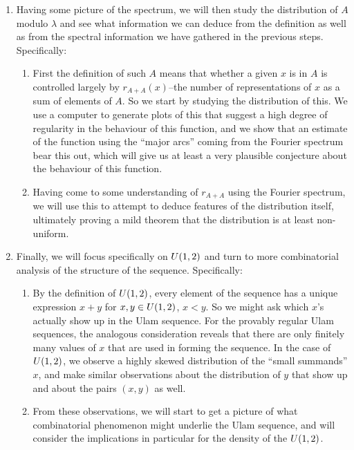 \documentclass{article}
\theoremstyle{definition}
\theoremstyle{remark}
\numberwithin{equation}{section}
\begin{document}
\begin{enumerate}
\item Having some picture of the spectrum, we will then study the
  distribution of $A$ modulo $\lambda$ and see what information we can
  deduce from the definition as well as from the spectral information
  we have gathered in the previous steps.  Specifically:
  \begin{enumerate}
  \item First the definition of such $A$ means that whether a given
    $x$ is in $A$ is controlled largely by $r_{A+A}(x)$--the number of
    representations of $x$ as a sum of elements of $A$.  So we start
    by studying the distribution of this.  We use a computer to
    generate plots of this that suggest a high degree of regularity in
    the behaviour of this function, and we show that an estimate of
    the function using the ``major arcs'' coming from the Fourier
    spectrum bear this out, which will give us at least a very
    plausible conjecture about the behaviour of this function.
  \item Having come to some understanding of $r_{A+A}$ using the
    Fourier spectrum, we will use this to attempt to deduce features
    of the distribution itself, ultimately proving a mild theorem that
    the distribution is at least non-uniform.
  \end{enumerate}

\item Finally, we will focus specifically on $U(1,2)$ and turn to
  more combinatorial analysis of the structure of the sequence.
  Specifically: 
  \begin{enumerate}
  \item By the definition of $U(1,2)$, every element of the
    sequence has a unique expression $x+y$ for $x, y \in U(1,2)$,
    $x < y$.  So we might ask which $x$'s actually show up in the Ulam
    sequence.  For the provably regular Ulam sequences, the analogous
    consideration reveals that there are only finitely many values of
    $x$ that are used in forming the sequence.  In the case of
    $U(1,2)$, we observe a highly skewed distribution of the
    ``small summands'' $x$, and make similar observations about the
    distribution of $y$ that show up and about the pairs $(x, y)$ as
    well.
  \item From these observations, we will start to get a picture of
    what combinatorial phenomenon might underlie the Ulam sequence, and
    will consider the implications in particular for the density of
    the $U(1,2)$.
  \end{enumerate}
\end{enumerate}
\end{document}

